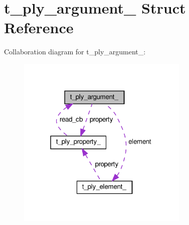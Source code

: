 \hypertarget{structt__ply__argument__}{}\section{t\+\_\+ply\+\_\+argument\+\_\+ Struct Reference}
\label{structt__ply__argument__}


Collaboration diagram for t\+\_\+ply\+\_\+argument\+\_\+\+:\nopagebreak
\begin{figure}[H]
\begin{center}
\leavevmode
\includegraphics[width=232pt]{structt__ply__argument____coll__graph}
\end{center}
\end{figure}
